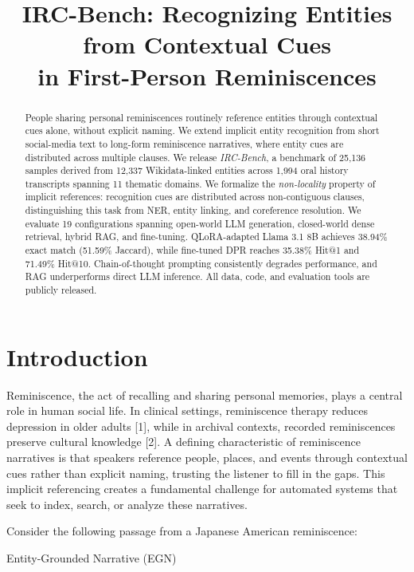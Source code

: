 ﻿\documentclass{article}
\title{IRC-Bench: Recognizing Entities from Contextual Cues\\in First-Person Reminiscences}
\author{}
\date{}
\begin{document}
\maketitle
\begin{abstract}

People sharing personal reminiscences routinely reference entities
through contextual cues alone, without explicit naming. We extend
implicit entity recognition from short social-media text to long-form
reminiscence narratives, where entity cues are distributed across
multiple clauses. We release \emph{IRC-Bench}, a benchmark of 25,136
samples derived from 12,337 Wikidata-linked entities across 1,994 oral
history transcripts spanning 11 thematic domains. We formalize the
\emph{non-locality} property of implicit references: recognition cues
are distributed across non-contiguous clauses, distinguishing this task
from NER, entity linking, and coreference resolution. We evaluate 19
configurations spanning open-world LLM generation, closed-world dense
retrieval, hybrid RAG, and fine-tuning. QLoRA-adapted Llama 3.1 8B
achieves 38.94\% exact match (51.59\% Jaccard), while fine-tuned DPR
reaches 35.38\% Hit@1 and 71.49\% Hit@10. Chain-of-thought prompting
consistently degrades performance, and RAG underperforms direct LLM
inference. All data, code, and evaluation tools are publicly released.

\end{abstract}

\section{Introduction}\label{introduction}

Reminiscence, the act of recalling and sharing personal memories, plays
a central role in human social life. In clinical settings, reminiscence
therapy reduces depression in older adults {[}1{]}, while in archival
contexts, recorded reminiscences preserve cultural knowledge {[}2{]}. A
defining characteristic of reminiscence narratives is that speakers
reference people, places, and events through contextual cues rather than
explicit naming, trusting the listener to fill in the gaps. This
implicit referencing creates a fundamental challenge for automated
systems that seek to index, search, or analyze these narratives.

Consider the following passage from a Japanese American reminiscence:

Entity-Grounded Narrative (EGN)
\end{document}
